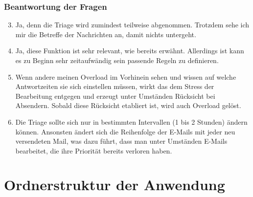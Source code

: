 \subsubsection*{Beantwortung der Fragen}
\begin{enumerate}
\setcounter{enumi}{2}
\item Ja, denn die Triage wird zumindest teilweise abgenommen. Trotzdem sehe ich mir die Betreffe der Nachrichten an, damit nichts untergeht.
\item Ja, diese Funktion ist sehr relevant, wie bereits erwähnt. Allerdings ist kann es zu Beginn sehr zeitaufwändig sein passende Regeln zu definieren.
\item Wenn andere meinen Overload im Vorhinein sehen und wissen auf welche Antwortzeiten sie sich einstellen müssen, wirkt das dem Stress der Bearbeitung entgegen und erzeugt unter Umständen Rücksicht bei Absendern. Sobald diese Rücksicht etabliert ist, wird auch Overload gelöst.
\item Die Triage sollte sich nur in bestimmten Intervallen (1 bis 2 Stunden) ändern können. Ansonsten ändert sich die Reihenfolge der E-Mails mit jeder neu versendeten Mail, was dazu führt, dass man unter Umständen E-Mails bearbeitet, die ihre Priorität bereits verloren haben.
\end{enumerate}

\newpage

\section{Ordnerstruktur der Anwendung}
\label{Ordnerstruktur_der_Anwendung}

